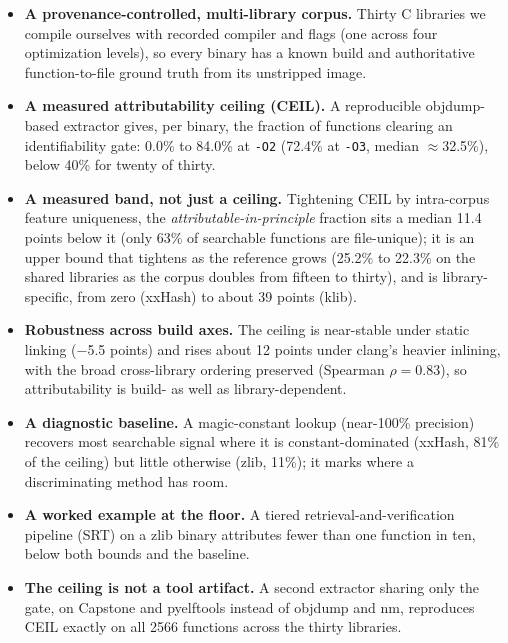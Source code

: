 \documentclass[conference]{IEEEtran}
\begin{document}
\begin{itemize}
\item \textbf{A provenance-controlled, multi-library corpus.} Thirty C libraries we
compile ourselves with recorded compiler and flags (one across four optimization
levels), so every binary has a known build and authoritative function-to-file ground
truth from its unstripped image.
\item \textbf{A measured attributability ceiling (CEIL).} A reproducible objdump-based
extractor gives, per binary, the fraction of functions clearing an identifiability
gate: 0.0\% to 84.0\% at \texttt{-O2} (72.4\% at \texttt{-O3}, median $\approx$32.5\%),
below 40\% for twenty of thirty.
\item \textbf{A measured band, not just a ceiling.} Tightening CEIL by intra-corpus
feature uniqueness, the \emph{attributable-in-principle} fraction sits a median 11.4
points below it (only 63\% of searchable functions are file-unique); it is an upper
bound that tightens as the reference grows (25.2\% to 22.3\% on the shared libraries as
the corpus doubles from fifteen to thirty), and is library-specific, from zero
(xxHash) to about 39 points (klib).
\item \textbf{Robustness across build axes.} The ceiling is near-stable under static
linking ($-$5.5 points) and rises about 12 points under clang's heavier inlining, with
the broad cross-library ordering preserved (Spearman $\rho=0.83$), so attributability is
build- as well as library-dependent.
\item \textbf{A diagnostic baseline.} A magic-constant lookup (near-100\% precision)
recovers most searchable signal where it is constant-dominated (xxHash, 81\% of the
ceiling) but little otherwise (zlib, 11\%); it marks where a discriminating method has room.
\item \textbf{A worked example at the floor.} A tiered retrieval-and-verification
pipeline (SRT) on a zlib binary attributes fewer than one function in ten, below both
bounds and the baseline.
\item \textbf{The ceiling is not a tool artifact.} A second extractor sharing only the
gate, on Capstone and pyelftools instead of objdump and nm, reproduces CEIL exactly on
all 2566 functions across the thirty libraries.
\end{itemize}
\end{document}

